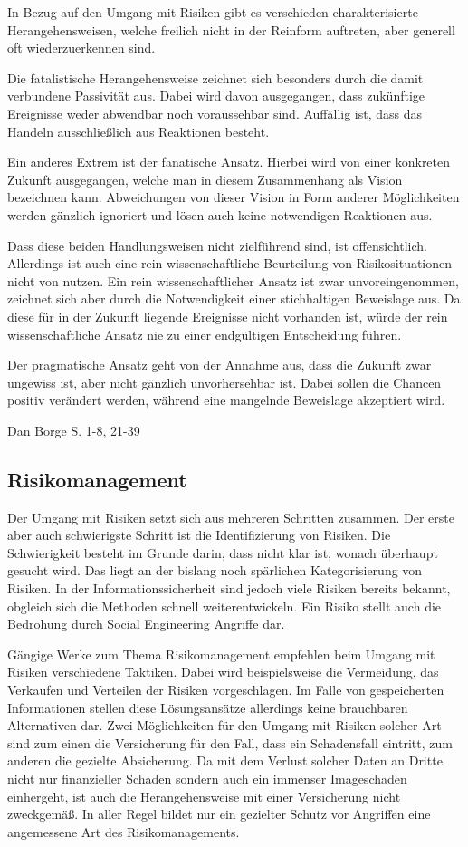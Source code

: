 In Bezug auf den Umgang mit Risiken gibt es verschieden charakterisierte Herangehensweisen, welche
freilich nicht in der Reinform auftreten, aber generell oft wiederzuerkennen sind.

Die fatalistische Herangehensweise zeichnet sich besonders durch die damit verbundene Passivität aus.
Dabei wird davon ausgegangen, dass zukünftige Ereignisse weder abwendbar noch voraussehbar sind.
Auffällig ist, dass das Handeln ausschließlich aus Reaktionen besteht.

Ein anderes Extrem ist der fanatische Ansatz. Hierbei wird von einer konkreten Zukunft ausgegangen,
welche man in diesem Zusammenhang als Vision bezeichnen kann.
Abweichungen von dieser Vision in Form anderer Möglichkeiten werden gänzlich ignoriert und lösen auch
keine notwendigen Reaktionen aus.

Dass diese beiden Handlungsweisen nicht zielführend sind, ist offensichtlich.
Allerdings ist auch eine rein wissenschaftliche Beurteilung von Risikosituationen nicht von nutzen.
Ein rein wissenschaftlicher Ansatz ist zwar unvoreingenommen, zeichnet sich aber durch die
Notwendigkeit einer stichhaltigen Beweislage aus.
Da diese für in der Zukunft liegende Ereignisse nicht vorhanden ist, würde der rein wissenschaftliche
Ansatz nie zu einer endgültigen Entscheidung führen.

Der pragmatische Ansatz geht von der Annahme aus, dass die Zukunft zwar ungewiss ist, aber nicht
gänzlich unvorhersehbar ist.
Dabei sollen die Chancen positiv verändert werden, während eine mangelnde Beweislage akzeptiert wird.

Dan Borge S. 1-8, 21-39

\subsection{Risikomanagement}\label{sub:risikomanagement}
Der Umgang mit Risiken setzt sich aus mehreren Schritten zusammen.
Der erste aber auch schwierigste Schritt ist die Identifizierung von Risiken.
Die Schwierigkeit besteht im Grunde darin, dass nicht klar ist, wonach überhaupt gesucht wird.
Das liegt an der bislang noch spärlichen Kategorisierung von Risiken.
In der Informationssicherheit sind jedoch viele Risiken bereits bekannt, obgleich sich die Methoden
schnell weiterentwickeln.
Ein Risiko stellt auch die Bedrohung durch Social Engineering Angriffe dar.

Gängige Werke zum Thema Risikomanagement empfehlen beim Umgang mit Risiken verschiedene Taktiken.
Dabei wird beispielsweise die Vermeidung, das Verkaufen und Verteilen der Risiken vorgeschlagen.
Im Falle von gespeicherten Informationen stellen diese Lösungsansätze allerdings keine brauchbaren
Alternativen dar.
Zwei Möglichkeiten für den Umgang mit Risiken solcher Art sind zum einen die Versicherung für den
Fall, dass ein Schadensfall eintritt, zum anderen die gezielte Absicherung.
Da mit dem Verlust solcher Daten an Dritte nicht nur finanzieller Schaden sondern auch ein immenser
Imageschaden einhergeht, ist auch die Herangehensweise mit einer Versicherung nicht zweckgemäß.
In aller Regel bildet nur ein gezielter Schutz vor Angriffen eine angemessene Art des
Risikomanagements.

